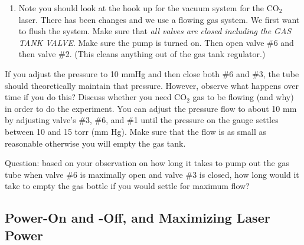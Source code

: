 \documentclass{../lab}
\begin{document}
\begin{enumerate}
    \item Note you should look at the hook up for the vacuum system for the CO$_2$ laser. There has been changes and we use a flowing gas system. We first want to flush the system. Make sure that \emph{all valves are closed including the GAS TANK VALVE}. Make sure the pump is turned on. Then open valve \#6 and then valve \#2. (This cleans anything out of the gas tank regulator.)
\end{enumerate}

If you adjust the pressure to 10 mmHg and then close both \#6 and \#3, the tube should theoretically maintain that pressure. However, observe what happens over time if you do this? Discuss whether you need CO$_2$ gas to be flowing (and why) in order to do the experiment. You can adjust the pressure flow to about 10 mm by adjusting valve's \#3, \#6, and \#1 until the pressure on the gauge settles between 10 and 15 torr (mm Hg). Make sure that the flow is as small as reasonable otherwise you will empty the gas tank.

Question: based on your observation on how long it takes to pump out the gas tube when valve \#6 is maximally open and valve \#3 is closed, how long would it take to empty the gas bottle if you would settle for maximum flow?

\subsection{Power-On and -Off, and Maximizing Laser Power}
\end{document}
